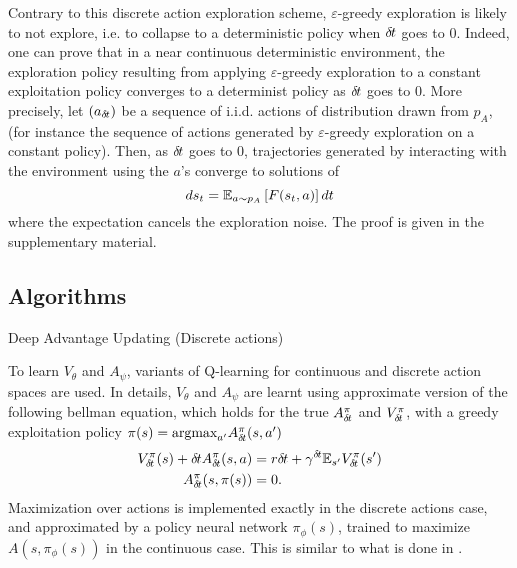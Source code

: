 Contrary to this discrete action exploration scheme, $\varepsilon$-greedy
exploration is likely to not explore, i.e. to collapse to a deterministic
policy when ${\delta\hspace{-.1em}t}$ goes to $0$. Indeed, one can prove that in a near
continuous deterministic environment, the exploration policy resulting from
applying $\varepsilon$-greedy exploration to a constant exploitation policy
converges to a determinist policy as ${\delta\hspace{-.1em}t}$ goes to $0$. More precisely, let
$(a_{\delta\hspace{-.1em}t})$ be a sequence of i.i.d. actions of distribution drawn from $p_A$, (for instance
the sequence of actions generated by $\varepsilon$-greedy exploration on a
constant policy). Then, as ${\delta\hspace{-.1em}t}$ goes to $0$, trajectories generated by
interacting with the environment using the $a$'s converge to solutions of
\begin{equation}
	ds_t = \mathbb{E}_{a\sim p_A}\left[F(s_t, a)\right]dt
\end{equation}
where the expectation cancels the exploration noise. The proof is given in the
supplementary material. 

\subsection{Algorithms}
\label{subsec:algorithm}
\begin{algorithm}[ht]
  \caption{Deep Advantage Updating (Discrete actions)}
  \label{alg:dau}
	
\end{algorithm}

To learn $V_{\theta}$ and $A_{\psi}$, variants of Q-learning for continuous and
discrete action spaces are used. In details, $V_{\theta}$ and $A_{\psi}$ are learnt
using approximate version of the following bellman equation, which holds for the true $A^\pi_{\delta\hspace{-.1em}t}$
and $V^\pi_{\delta\hspace{-.1em}t}$, with a greedy exploitation policy $\pi(s) = \text{argmax}_{a'}A^\pi_{\delta\hspace{-.1em}t}(s, a')$
\begin{align}
	V^{\pi}_{\delta\hspace{-.1em}t}(s) + {\delta\hspace{-.1em}t} A^{\pi}_{\delta\hspace{-.1em}t}(s, a) &= r{\delta\hspace{-.1em}t} + \gamma^{{\delta\hspace{-.1em}t}}  \mathbb{E}_{s'} V^{\pi}_{\delta\hspace{-.1em}t}(s')\label{eq:bellman_A}\\
	A^{\pi}_{\delta\hspace{-.1em}t}(s, \pi(s)) &= 0\label{eq:max_A}.
\end{align}
Maximization over actions is implemented exactly in the discrete actions case,
and approximated by a policy neural network $\pi_\phi(s)$, trained to maximize $A(s,
\pi_\phi(s))$ in the continuous case.  This is similar to what is done in
\cite{ddpg}.

